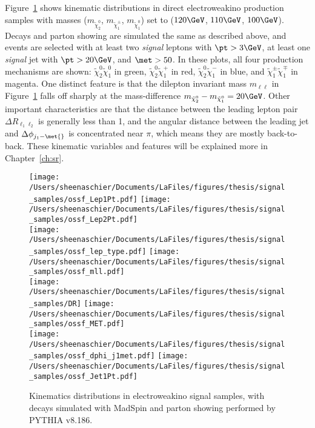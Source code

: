 Figure~\ref{fig:SigSample1} shows kinematic distributions in direct electroweakino production samples with masses ($m_{\tilde\chi_2^0}$, $m_{\tilde\chi_1^\pm}$, $m_{\tilde\chi_1^0}$) set to ($120\GeV$, $110\GeV$, $100\GeV$).  Decays and parton showing are simulated the same as described above, and events are selected with at least two \textit{signal} leptons with $\pt>3\GeV$, at least one \textit{signal} jet with $\pt>20\GeV$, and $\met>50$.  In these plots, all four production mechanisms are shown: $\tilde\chi_2^0\tilde\chi_1^0$ in green, $\tilde\chi_2^0\tilde\chi_1^+$ in red, $\tilde\chi_2^0\tilde\chi_1^-$ in blue, and $\tilde\chi_1^\pm\tilde\chi_1^\mp$ in magenta.  One distinct feature is that the dilepton invariant mass $m_{\ell\ell}$ in Figure~\ref{fig:SigSample1} falls off sharply at the mass-difference $m_{\tilde\chi_2^0}-m_{\tilde\chi_1^0} = 20\GeV$.  Other important characteristics are that the distance between the leading lepton pair $\Delta R_{\ell_1\ell_2}$ is generally less than 1, and the angular distance between the leading jet and \met $\Delta\phi_{j_1-\met{}}$ is concentrated near $\pi$, which means they are mostly back-to-back.  These kinematic variables and features will be explained more in Chapter~\ref{ch:sr}. 

  \begin{figure}[tbp]
 \texttt{[image: /Users/sheenaschier/Documents/LaFiles/figures/thesis/signal\_samples/ossf\_Lep1Pt.pdf]}
 \texttt{[image: /Users/sheenaschier/Documents/LaFiles/figures/thesis/signal\_samples/ossf\_Lep2Pt.pdf]}\\
 \texttt{[image: /Users/sheenaschier/Documents/LaFiles/figures/thesis/signal\_samples/ossf\_lep\_type.pdf]}
  \texttt{[image: /Users/sheenaschier/Documents/LaFiles/figures/thesis/signal\_samples/ossf\_mll.pdf]}\\
  \texttt{[image: /Users/sheenaschier/Documents/LaFiles/figures/thesis/signal\_samples/DR]}
    \texttt{[image: /Users/sheenaschier/Documents/LaFiles/figures/thesis/signal\_samples/ossf\_MET.pdf]}\\
      \texttt{[image: /Users/sheenaschier/Documents/LaFiles/figures/thesis/signal\_samples/ossf\_dphi\_j1met.pdf]}
       \texttt{[image: /Users/sheenaschier/Documents/LaFiles/figures/thesis/signal\_samples/ossf\_Jet1Pt.pdf]}
 \caption{Kinematics distributions in electroweakino signal samples, with decays simulated with MadSpin and parton showing performed by PYTHIA v8.186.}
   \label{fig:SigSample1}
 \end{figure}
 
